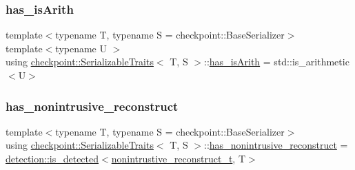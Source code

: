 \subsubsection{\texorpdfstring{has\+\_\+is\+Arith}{has\_isArith}}
{\footnotesize\ttfamily template$<$typename T, typename S = checkpoint\+::\+Base\+Serializer$>$ \\
template$<$typename U $>$ \\
using \hyperlink{structcheckpoint_1_1_serializable_traits}{checkpoint\+::\+Serializable\+Traits}$<$ T, S $>$\+::\hyperlink{structcheckpoint_1_1_serializable_traits_a8a8b20be974e219f4fb39b4346be0536}{has\+\_\+is\+Arith} =  std\+::is\+\_\+arithmetic$<$U$>$}

\mbox{\label{structcheckpoint_1_1_serializable_traits_aeaa2e5459d2910f2ed6a8e423b45552b}} 
\subsubsection{\texorpdfstring{has\+\_\+nonintrusive\+\_\+reconstruct}{has\_nonintrusive\_reconstruct}}
{\footnotesize\ttfamily template$<$typename T, typename S = checkpoint\+::\+Base\+Serializer$>$ \\
using \hyperlink{structcheckpoint_1_1_serializable_traits}{checkpoint\+::\+Serializable\+Traits}$<$ T, S $>$\+::\hyperlink{structcheckpoint_1_1_serializable_traits_aeaa2e5459d2910f2ed6a8e423b45552b}{has\+\_\+nonintrusive\+\_\+reconstruct} =  \hyperlink{namespacedetection_a30893549a3de1e9603d78dad6d5dce92}{detection\+::is\+\_\+detected}$<$\hyperlink{structcheckpoint_1_1_serializable_traits_abe5231bdf561e55fd9e0673e42a8a96c}{nonintrustive\+\_\+reconstruct\+\_\+t}, T$>$}

\mbox{\label{structcheckpoint_1_1_serializable_traits_abc3628bc485acd98b08840fb99450850}} 
